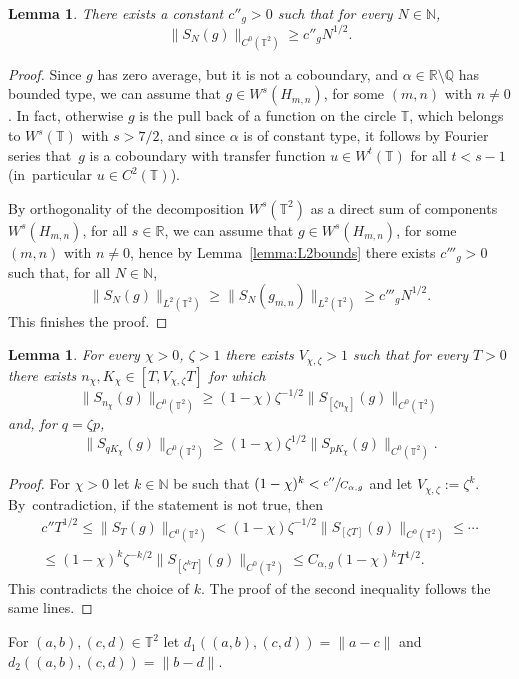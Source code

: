 \documentclass[JEP,XML,SOM,Unicode,NoEqCountersInSection]{cedram}
\theoremstyle{definition}
\theoremstyle{plain}
\newtheorem{lemma}[definition]{Lemma}
\newcommand\NN{\mathbb{N}}
\newcommand\QQ{\mathbb{Q}}
\newcommand\RR{\mathbb{R}}
\newcommand\TT{\mathbb{T}}
\begin{document}
\begin{lemma}\label{lem:gro} There exists a constant $c''_g>0$ such that for every $N\in \NN$,
\[
\|S_{N}(g)\|_{C^0(\TT^2)}\geq c''_g N^{1/2}.
\]
\end{lemma}
\begin{proof}
Since $g$ has zero average, but it is not a coboundary, and $\alpha\in \RR\setminus \QQ$ has bounded type, we can assume that $g\in W^s(H_{m,n})$, for some
$(m,n)$ with $n\neq 0$. In fact, otherwise $g$ is the pull back of a function on the circle $\TT$, which belongs to $W^s(\TT)$ with $s> 7/2$, and since $\alpha$ is of constant
type, it follows by Fourier series that~$g$ is a coboundary with transfer function $u \in W^t(\TT)$ for all $t<s-1$ (in~particular $u\in C^2(\TT)$).

By orthogonality of the decomposition $W^s(\TT^2)$ as a direct sum of components $W^s(H_{m,n})$, for all $s\in \RR$, we can assume that $g\in W^s(H_{m,n})$, for some
$(m,n)$ with $n\neq 0$, hence by Lemma~\ref{lemma:L2bounds} there exists $c'''_g >0$ such that, for all $N\in \NN$,
\[
\|S_{N}(g)\|_{L^2(\TT^2)}\geq \|S_{N}(g_{m,n})\|_{L^2(\TT^2)} \geq c'''_gN^{1/2}.
\]
This finishes the proof.
\end{proof}

\begin{lemma}\label{lem:supr} For every $\chi>0$, $\zeta>1$ there exists $V_{\chi,\zeta}>1$ such that for every $T>0$ there exists $n_\chi,K_\chi\in [T,V_{\chi,\zeta} T]$ for which
\[
\|S_{n_\chi}(g)\|_{C^0(\TT^2)}\geq (1-\chi)\zeta^{-1/2}\|S_{[\zeta n_\chi]}(g)\|_{C^0(\TT^2)}
\]
and, for $q=\zeta p $,
\[
\|S_{qK_\chi}(g)\|_{C^0(\TT^2)}\geq (1-\chi)\zeta^{1/2}\|S_{ pK_\chi}(g)\|_{C^0(\TT^2)}.
\]
\end{lemma}
\begin{proof} For $\chi>0$ let $k\in \NN$ be such that $(1-\chi)^k< \sfrac{c''}{C_{\alpha,g}}$ and let $V_{\chi,\zeta}:=\zeta^k$.
By~contradiction, if the statement is not true, then
\begin{multline*}
c'' T^{1/2}\leq \|S_{T}(g)\|_{C^0(\TT^2)}<(1-\chi)\zeta^{-1/2}\|S_{[\zeta T]}(g)\|_{C^0(\TT^2)}\leq
\cdots\\
\leq
(1-\chi)^k\zeta^{-k/2}\|S_{[\zeta^k T]}(g)\|_{C^0(\TT^2)}\leq C_{\alpha,g}(1-\chi)^kT^{1/2}.
\end{multline*}
This contradicts the choice of $k$. The proof of the second inequality follows the same lines.
\end{proof}

For $(a,b),(c,d)\in \TT^2$ let $d_1((a,b),(c,d))=\|a-c\|$ and $d_2((a,b),(c,d))=\|b-d\|$.
\end{document}
